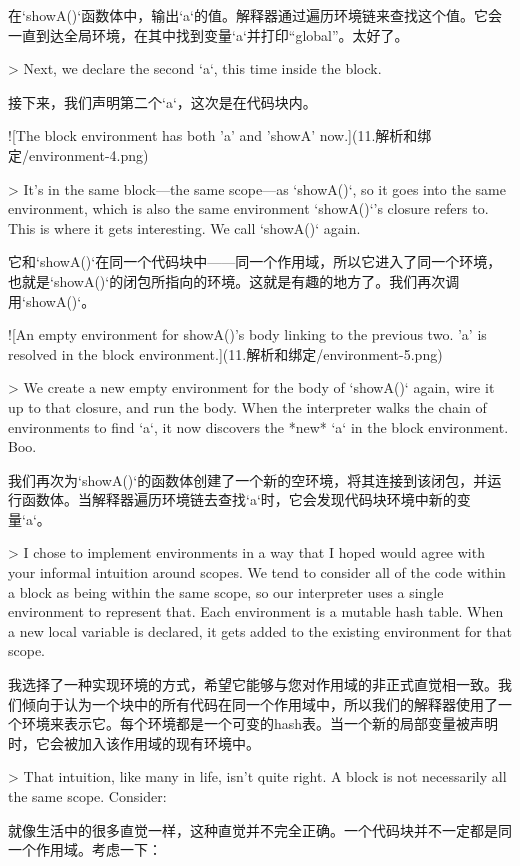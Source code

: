 \documentclass[cn,11pt,chinese]{elegantbook}
\begin{document}
{{{在`showA()`函数体中，输出`a`的值。解释器通过遍历环境链来查找这个值。它会一直到达全局环境，在其中找到变量`a`并打印“global”。太好了。

> Next, we declare the second `a`, this time inside the block.

接下来，我们声明第二个`a`，这次是在代码块内。

![The block environment has both 'a' and 'showA' now.](11.解析和绑定/environment-4.png)

> It’s in the same block—the same scope—as `showA()`, so it goes into the same environment, which is also the same environment `showA()`’s closure refers to. This is where it gets interesting. We call `showA()` again.

它和`showA()`在同一个代码块中——同一个作用域，所以它进入了同一个环境，也就是`showA()`的闭包所指向的环境。这就是有趣的地方了。我们再次调用`showA()`。

![An empty environment for showA()'s body linking to the previous two. 'a' is resolved in the block environment.](11.解析和绑定/environment-5.png)

> We create a new empty environment for the body of `showA()` again, wire it up to that closure, and run the body. When the interpreter walks the chain of environments to find `a`, it now discovers the *new* `a` in the block environment. Boo.

我们再次为`showA()`的函数体创建了一个新的空环境，将其连接到该闭包，并运行函数体。当解释器遍历环境链去查找`a`时，它会发现代码块环境中新的变量`a`。

> I chose to implement environments in a way that I hoped would agree with your informal intuition around scopes. We tend to consider all of the code within a block as being within the same scope, so our interpreter uses a single environment to represent that. Each environment is a mutable hash table. When a new local variable is declared, it gets added to the existing environment for that scope.

我选择了一种实现环境的方式，希望它能够与您对作用域的非正式直觉相一致。我们倾向于认为一个块中的所有代码在同一个作用域中，所以我们的解释器使用了一个环境来表示它。每个环境都是一个可变的hash表。当一个新的局部变量被声明时，它会被加入该作用域的现有环境中。

> That intuition, like many in life, isn’t quite right. A block is not necessarily all the same scope. Consider:

就像生活中的很多直觉一样，这种直觉并不完全正确。一个代码块并不一定都是同一个作用域。考虑一下：

}}}
\end{document}
